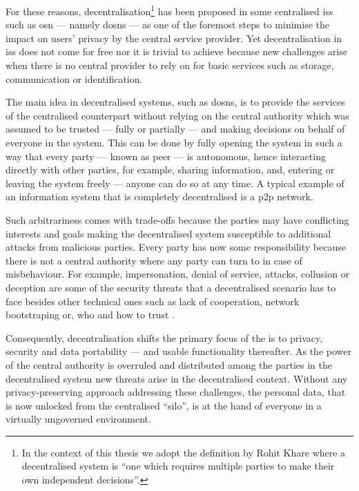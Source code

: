 \documentclass[showtrims, oldfontcommands]{kthesis}
\begin{document}
For these reasons, decentralisation\footnote{In the context of this thesis we adopt 
the definition by Rohit Khare where a decentralised system is ``one which requires 
multiple parties to make their own independent decisions''.} has been proposed in 
some centralised \acp{is} such as \ac{osn} --- namely \acp{dosn} --- 
as one of the foremost steps to minimise the impact on users' privacy by the central 
service provider. Yet decentralisation in \acp{is} does not come for 
free nor it is trivial to achieve because new challenges arise when there is no 
central provider to rely on for basic services such as storage, communication or 
identification.

The main idea in decentralised systems, such as \acp{dosn}, is to provide the services 
of the centralised counterpart without relying on the central authority which was 
assumed to be trusted --- fully or partially --- and making decisions on behalf 
of everyone in the system. This can be done by fully opening the system in such 
a way that every party --- known as peer --- is autonomous, hence interacting directly 
with other parties, for example, sharing information, and, entering or leaving the 
system freely --- anyone can do so at any time. A typical example of an information 
system that is completely decentralised is a \ac{p2p} network.

Such arbitrariness comes with trade-offs because the parties may have conflicting 
interests and goals making the decentralised system susceptible to additional attacks 
from malicious parties. Every party has now some responsibility because there is 
not a central authority where any party can turn to in case of misbehaviour. For 
example, impersonation, denial of service, \Sybil attacks, collusion or deception 
are some of the security threats that a decentralised scenario has to face besides 
other technical ones such as lack of cooperation, network bootstraping or, who and 
how to trust \cite{BucheggerA09}.

Consequently, decentralisation shifts the primary focus of the \ac{is} 
to privacy, security and data portability --- and usable functionality thereafter. 
As the power of the central authority is overruled and distributed among the parties 
in the decentralised system new threats arise in the decentralised context. Without 
any privacy-preserving approach addressing these challenges, the personal data, 
that is now unlocked from the centralised ``silo'', is at the hand of everyone in 
a virtually ungoverned environment.
\end{document}

